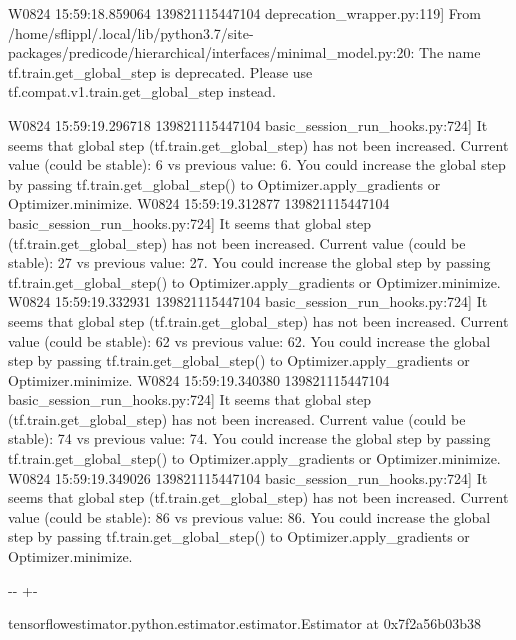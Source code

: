 \documentclass[letterpaper,10pt,english]{sphinxmanual}
\newlength\nbsphinxcodecellspacing
\begin{document}
{\begin{sphinxVerbatim}[commandchars=\\\{\}]
W0824 15:59:18.859064 139821115447104 deprecation\_wrapper.py:119] From /home/sflippl/.local/lib/python3.7/site-packages/predicode/hierarchical/interfaces/minimal\_model.py:20: The name tf.train.get\_global\_step is deprecated. Please use tf.compat.v1.train.get\_global\_step instead.

W0824 15:59:19.296718 139821115447104 basic\_session\_run\_hooks.py:724] It seems that global step (tf.train.get\_global\_step) has not been increased. Current value (could be stable): 6 vs previous value: 6. You could increase the global step by passing tf.train.get\_global\_step() to Optimizer.apply\_gradients or Optimizer.minimize.
W0824 15:59:19.312877 139821115447104 basic\_session\_run\_hooks.py:724] It seems that global step (tf.train.get\_global\_step) has not been increased. Current value (could be stable): 27 vs previous value: 27. You could increase the global step by passing tf.train.get\_global\_step() to Optimizer.apply\_gradients or Optimizer.minimize.
W0824 15:59:19.332931 139821115447104 basic\_session\_run\_hooks.py:724] It seems that global step (tf.train.get\_global\_step) has not been increased. Current value (could be stable): 62 vs previous value: 62. You could increase the global step by passing tf.train.get\_global\_step() to Optimizer.apply\_gradients or Optimizer.minimize.
W0824 15:59:19.340380 139821115447104 basic\_session\_run\_hooks.py:724] It seems that global step (tf.train.get\_global\_step) has not been increased. Current value (could be stable): 74 vs previous value: 74. You could increase the global step by passing tf.train.get\_global\_step() to Optimizer.apply\_gradients or Optimizer.minimize.
W0824 15:59:19.349026 139821115447104 basic\_session\_run\_hooks.py:724] It seems that global step (tf.train.get\_global\_step) has not been increased. Current value (could be stable): 86 vs previous value: 86. You could increase the global step by passing tf.train.get\_global\_step() to Optimizer.apply\_gradients or Optimizer.minimize.
\end{sphinxVerbatim}
}
\relax

{

\kern-\sphinxverbatimsmallskipamount\kern-\baselineskip
\kern+\FrameHeightAdjust\kern-\fboxrule
\vspace{\nbsphinxcodecellspacing}

\begin{sphinxVerbatim}[commandchars=\\\{\}]
\llap{\color{nbsphinxout}[6]:\,\hspace{\fboxrule}\hspace{\fboxsep}}\PYGZlt{}tensorflow\PYGZus{}estimator.python.estimator.estimator.Estimator at 0x7f2a56b03b38\PYGZgt{}
\end{sphinxVerbatim}
}
\end{document}
